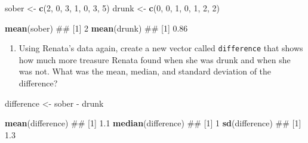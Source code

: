 \documentclass[]{book}
\newenvironment{Shaded}{\begin{snugshade}}{\end{snugshade}}
\newcommand{\KeywordTok}[1]{\textcolor[rgb]{0.13,0.29,0.53}{\textbf{{#1}}}}
\newcommand{\DecValTok}[1]{\textcolor[rgb]{0.00,0.00,0.81}{{#1}}}
\newcommand{\StringTok}[1]{\textcolor[rgb]{0.31,0.60,0.02}{{#1}}}
\newcommand{\NormalTok}[1]{{#1}}
\providecommand{\tightlist}{%
  \setlength{\itemsep}{0pt}\setlength{\parskip}{0pt}}
\theoremstyle{definition}
\theoremstyle{definition}
\theoremstyle{remark}
\begin{document}
\begin{Shaded}
\begin{Highlighting}[]
\NormalTok{sober <-}\StringTok{ }\KeywordTok{c}\NormalTok{(}\DecValTok{2}\NormalTok{, }\DecValTok{0}\NormalTok{, }\DecValTok{3}\NormalTok{, }\DecValTok{1}\NormalTok{, }\DecValTok{0}\NormalTok{, }\DecValTok{3}\NormalTok{, }\DecValTok{5}\NormalTok{)}
\NormalTok{drunk <-}\StringTok{ }\KeywordTok{c}\NormalTok{(}\DecValTok{0}\NormalTok{, }\DecValTok{0}\NormalTok{, }\DecValTok{1}\NormalTok{, }\DecValTok{0}\NormalTok{, }\DecValTok{1}\NormalTok{, }\DecValTok{2}\NormalTok{, }\DecValTok{2}\NormalTok{)}

\KeywordTok{mean}\NormalTok{(sober)}
\NormalTok{## [1] 2}
\KeywordTok{mean}\NormalTok{(drunk)}
\NormalTok{## [1] 0.86}
\end{Highlighting}
\end{Shaded}

\begin{enumerate}
\def\labelenumi{\arabic{enumi}.}
\setcounter{enumi}{2}
\tightlist
\item
  Using Renata's data again, create a new vector called
  \texttt{difference} that shows how much more treasure Renata found
  when she was drunk and when she was not. What was the mean, median,
  and standard deviation of the difference?
\end{enumerate}

\begin{Shaded}
\begin{Highlighting}[]
\NormalTok{difference <-}\StringTok{ }\NormalTok{sober -}\StringTok{ }\NormalTok{drunk}

\KeywordTok{mean}\NormalTok{(difference)}
\NormalTok{## [1] 1.1}
\KeywordTok{median}\NormalTok{(difference)}
\NormalTok{## [1] 1}
\KeywordTok{sd}\NormalTok{(difference)}
\NormalTok{## [1] 1.3}
\end{Highlighting}
\end{Shaded}
\end{document}
